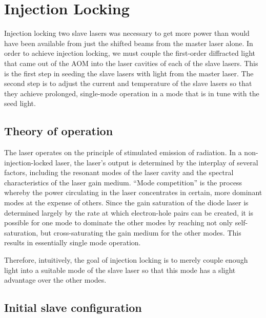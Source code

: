  \chapter{Injection Locking}\label{InjectionLockingChapter}

Injection locking two slave lasers was necessary to get more power than would have been available from just the shifted beams from the master laser alone. 
In order to achieve injection locking, we must couple the first-order diffracted light that came out of the AOM into the laser cavities of each of the slave lasers. This is the first step in seeding the slave lasers with light from the master laser. The second step is to adjust the current and temperature of the slave lasers so that they achieve prolonged, single-mode operation in a mode that is in tune with the seed light. 

\section{Theory of operation}


The laser operates on the principle of stimulated emission of radiation. In a non-injection-locked laser, the laser's output is determined by the interplay of several factors, including the resonant modes of the laser cavity and the spectral characteristics of the laser gain medium.
``Mode competition'' is the process whereby the power circulating in the laser concentrates in certain, more dominant modes at the expense of others. Since the gain saturation of the diode laser is determined largely by the rate at which electron-hole pairs can be created, it is possible for one mode to dominate the other modes by reaching not only self-saturation, but cross-saturating the gain medium for the other modes\cite{RPPhotonicsEncyclopediaAndBuyersGuide}. This results in essentially single mode operation. 

Therefore, intuitively, the goal of injection locking is to merely couple enough light into a suitable mode of the slave laser so that this mode has a slight advantage over the other modes. 

\section{Initial slave configuration}
\label{initialSlaveConfiguration}


